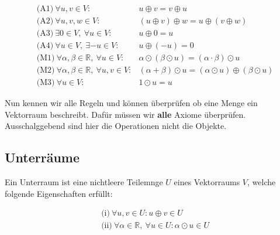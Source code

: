 \begin{tcolorbox}[colback=gray!30, colframe=gray!80, title=Axiome für Vektorräume]
    \begin{equation*}
        \begin{aligned}
            &\text{(A1)} \ \forall u, v \in V: &u \oplus v = v \oplus u \\
            &\text{(A2)} \ \forall u, v, w \in V: &(u \oplus v) \oplus w = u \oplus (v \oplus w) \\
            &\text{(A3)} \ \exists 0 \in V, \ \forall u \in V: & u \oplus 0 = u \\
            &\text{(A4)} \ \forall u \in V, \ \exists -u \in V: & u \oplus (-u) = 0 \\
            &\text{(M1)} \ \forall \alpha, \beta \in \mathbb{R}, \ \forall u \in V: & \alpha \odot (\beta \odot u) = (\alpha \cdot \beta) \odot u \\
            &\text{(M2)} \ \forall \alpha, \beta \in \mathbb{R}, \ \forall u, v \in V: & (\alpha + \beta) \odot u = (\alpha \odot u) \oplus (\beta \odot u) \\
            &\text{(M3)} \ \forall u \in V: & 1 \odot u = u
        \end{aligned}
    \end{equation*}
\end{tcolorbox}

\vspace{1\baselineskip}

Nun kennen wir alle Regeln und können überprüfen ob eine Menge ein Vektorraum beschreibt. Dafür müssen wir \textbf{alle} Axiome überprüfen. Ausschalggebend sind hier die Operationen nicht die Objekte.

\subsection{Unterräume}

Ein Unterraum ist eine nichtleere Teilemnge \( U \) eines Vektorraums \( V \), welche folgende Eigenschaften erfüllt:

\begin{equation*}
    \begin{aligned}
        &\text{(i)} \ \forall u, v \in U: u \oplus v \in U \\
        &\text{(ii)} \ \forall \alpha \in \mathbb{R}, \ \forall u \in U: \alpha \odot u \in U
    \end{aligned}
\end{equation*}


